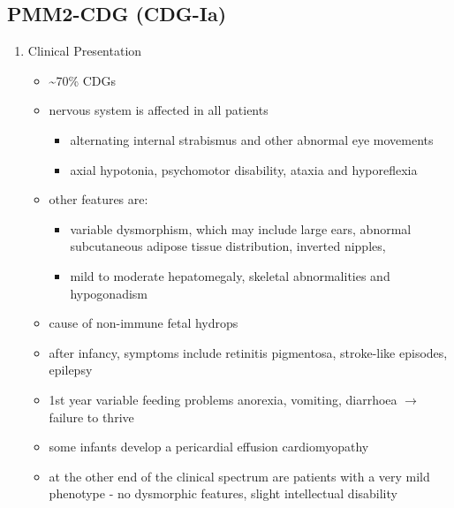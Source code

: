 \documentclass{scrartcl}
\begin{document}
\subsection{PMM2-CDG (CDG-Ia)}
\label{sec:orgd56884a}
\begin{enumerate}
\item Clinical Presentation
\label{sec:org75813b9}
\begin{itemize}
\item \textasciitilde{}70\% CDGs
\item nervous system is affected in all patients
\begin{itemize}
\item alternating internal strabismus and other abnormal eye movements
\item axial hypotonia, psychomotor disability, ataxia and hyporeflexia
\end{itemize}
\item other features are:
\begin{itemize}
\item variable dysmorphism, which may include large ears, abnormal
subcutaneous adipose tissue distribution, inverted nipples,
\item mild to moderate hepatomegaly, skeletal abnormalities and hypogonadism
\end{itemize}
\item cause of non-immune fetal hydrops
\item after infancy, symptoms include retinitis pigmentosa, stroke-like episodes, \textpm{} epilepsy
\item 1st year variable feeding problems anorexia, vomiting, diarrhoea \(\to\) failure to thrive
\item some infants develop a pericardial effusion \textpm{} cardiomyopathy
\item at the other end of the clinical spectrum are patients with a very
mild phenotype - no dysmorphic features, slight intellectual disability
\end{itemize}


\end{enumerate}
\end{document}
